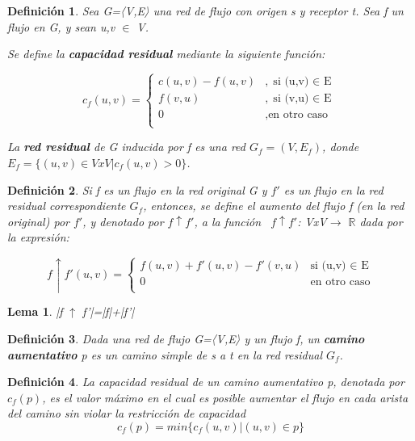 \documentclass[10pt]{article} %
\newtheorem{mydef}{Definici\'on}%
\newtheorem{lem}{Lema}
\begin{document}
	\begin{mydef}
		Sea G=〈V,E〉 una red de flujo con origen s y receptor t. Sea f un flujo en G, y sean u,v $\in$ V.
		
		Se define la \textbf{capacidad residual} mediante la siguiente función:
		
		\begin{equation}
			c_f(u,v) = 	\left\{		
			\begin{array}{lr}				
				c(u,v) -f(u,v) & , \text{si (u,v) $\in$ E}\\
				f(v,u) &, \text{si (v,u) $\in$ E}\\
				0 &,\text{en otro caso}\\
			\end{array}
		\right.
		\end{equation}
	
	La \textbf{red residual} de G inducida por f es una red $G_f=(V,E_f)$, donde 
	$E_f= \{ (u,v) \in VxV | c_f(u,v)>0 \}$.
	\end{mydef}

	\begin{mydef}
		
		Si f es un flujo en la red original G y $f'$ es un flujo en la red residual correspondiente $G_f$, entonces, se define el aumento del flujo f (en la  red  original) por $f'$, y denotado por $f\uparrow f'$, a la función  $f\uparrow f'$: VxV$\rightarrow$ $\mathbb{R}$ dada por la expresión:
		
		\begin{equation}
			f\uparrow f'(u,v) = \left\{ \begin{array}{lr}
				f(u,v) + f'(u,v) - f'(v,u) & \text{si (u,v) $\in$ E}\\
				0 & \text{en otro caso}\\
			\end{array}
		\right.
		\end{equation}
		
	\end{mydef}
	
	\begin{lem}
		|f $\uparrow$ f'|=|f|+|f'|
	\end{lem}
	
	\begin{mydef}
		Dada una red de flujo G=〈V,E〉 y un flujo f, un \textbf{camino aumentativo} p es un camino simple de s a t en la red residual $G_f$.
	\end{mydef}

	\begin{mydef}
		La capacidad residual de un camino aumentativo p, denotada por $c_f(p)$, es el valor máximo en el cual es posible aumentar el flujo en cada arista del camino sin violar la restricción de capacidad
		\begin{equation}
			c_f(p) = min\{c_f(u,v) | (u,v) \in p \}
		\end{equation}
	\end{mydef}
\end{document}
